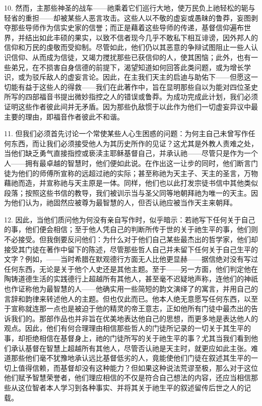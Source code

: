 10. 然而，主那些神圣的战车——祂乘着它们巡行大地，使万民负上祂轻松的轭与轻省的重担——却被某些人恶言攻击。这些人以不敬的虚妄或愚昧的鲁莽，妄图剥夺那些导师作为信实史家的信誉；而正是藉着这些导师的传递，基督信仰遍布世界，并结出如此丰硕的果实，以致不信者现今几乎不敢私下相互诽谤，因外邦人的信仰和万民的虔敬而受抑制。尽管如此，他们仍以其恶意的争辩试图阻止一些人认识信仰、从而成为信徒，又竭力搅扰那些已获信仰的人，使其困恼；此外，也有一些弟兄，在不损害自身信德的前提下，渴望知道如何回答此类问题，或为增长学识，或为驳斥敌人的虚妄言论。因此，在主我们天主的启迪与助佑下——但愿这一切能有益于这些人的得救——我们在此著作中，旨在显明那些自以为能对四位圣史所写的四部福音书提出微妙指控之人的错误或鲁莽。为成功完成此计划，我们必须证明这些作者彼此间并无矛盾。因为那些仇敌惯于以此作为他们一切虚妄异议中最主要的理由，即福音作者彼此不和谐。\par

11. 但我们必须首先讨论一个常使某些人心生困惑的问题：为何主自己未曾写作任何东西，而让我们必须接受他人为其历史所作的见证？这尤其是外教人责难之处，当他们缺乏勇气直接指控或亵渎主耶稣基督自己，并承认祂——尽管只是作为一个人——拥有最卓越的智慧时，他们便如此说。在作出这一让步的同时，他们断言门徒为他们的师傅所宣称的远超过祂的实际；甚至称祂为天主子、天主的圣言，万物藉祂而造，并宣称祂与天主原是一体。同样，他们也以此打发宗徒书信中其他类似段落；按照这些书信的教导，我们被训示当与圣父同等地朝拜祂为唯一的天主。因为他们认为，祂固然应被尊为最智慧的人，但否认祂应被当作天主来朝拜。\par

12. 因此，当他们质问他为何没有亲自写作时，似乎暗示：若祂写下任何关于自己的事，他们便会相信；至于他人凭自己的判断所传于世的关于祂生平的事，他们则不必接受。但我倒要反问他们：为什么对于他们自己某些最杰出的哲学家，他们却接受其门徒在著作中留下的陈述，尽管那些哲人自己并未留下任何关于自己生平的文字？例如，——当时希腊在默观德行方面无人比他更显赫——据信绝对没有写过任何东西，无论是关于他个人史还是其他主题。至于——另一方面，他们判定他在陶铸道德生活的实践德行上超越所有其他人，甚至毫不迟疑地声称，连他们的神祇也作证称他为最智慧的人——他确实用一些简短的韵文演绎了的寓言，并用自己的言辞和韵律来转述他人的主题。但也仅此而已。他本人绝无意愿写任何东西，以至于宣称就连那一点也是被迫于他的精灵的帝王意志，正如他所有门徒中最杰出的告诉我们的。那部作品也并非旨在优美地表达他自己的思想，而更多地是表达他人的观点。因此，他们有何合理理由相信那些哲人的门徒所记录的一切关于其生平的事，却拒绝相信在基督身上，祂的门徒所写的关于祂生平的事？尤其当我们看到他们承认基督在智慧上超越所有其他人，尽管否认祂是天主时，就更应如此主张。难道那些他们毫不犹豫地承认远比基督低劣的人，竟能使他们门徒在叙述其生平的一切上值得信赖，而基督却没有这种能力？但如果这种说法荒谬至极，那么对于这位他们赋予智慧荣誉者，他们理应相信的不仅是符合自己想法的内容，还应当相信那些从这位智者本人学习到各种事实、并将其关于祂生平的叙述留传后世之人的记载。\par

